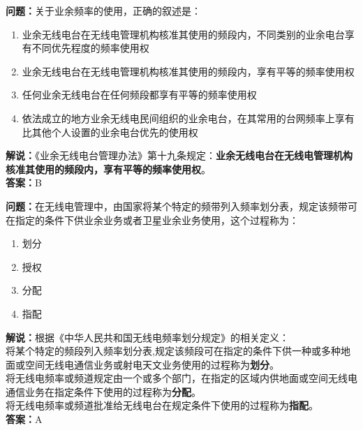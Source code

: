 \documentclass{ctexbook}
\begin{document}
\bigskip


\noindent\textbf{问题：}关于业余频率的使用，正确的叙述是：
\begin{enumerate}[label=\Alph*), leftmargin=3em]
	\item 业余无线电台在无线电管理机构核准其使用的频段内，不同类别的业余电台享有不同优先程度的频率使用权
	\item 业余无线电台在无线电管理机构核准其使用的频段内，享有平等的频率使用权
	\item 任何业余无线电台在任何频段都享有平等的频率使用权
	\item 依法成立的地方业余无线电民间组织的业余电台，在其常用的台网频率上享有比其他个人设置的业余电台优先的使用权
\end{enumerate}
\noindent\textbf{解说：}《业余无线电台管理办法》第十九条规定：\textbf{业余无线电台在无线电管理机构核准其使用的频段内，享有平等的频率使用权}。\\\noindent\textbf{答案：}B



\bigskip


\noindent\textbf{问题：}在无线电管理中，由国家将某个特定的频带列入频率划分表，规定该频带可在指定的条件下供业余业务或者卫星业余业务使用，这个过程称为：
\begin{enumerate}[label=\Alph*), leftmargin=3em]
	\item 划分
	\item 授权
	\item 分配
	\item 指配
\end{enumerate}
\noindent\textbf{解说：}根据《中华人民共和国无线电频率划分规定》的相关定义：\\将某个特定的频段列入频率划分表,规定该频段可在指定的条件下供一种或多种地面或空间无线电通信业务或射电天文业务使用的过程称为\textbf{划分}。\\将无线电频率或频道规定由一个或多个部门，在指定的区域内供地面或空间无线电通信业务在指定条件下使用的过程称为\textbf{分配}。\\将无线电频率或频道批准给无线电台在规定条件下使用的过程称为\textbf{指配}。\\
\textbf{答案：}A



\bigskip
\end{document}
